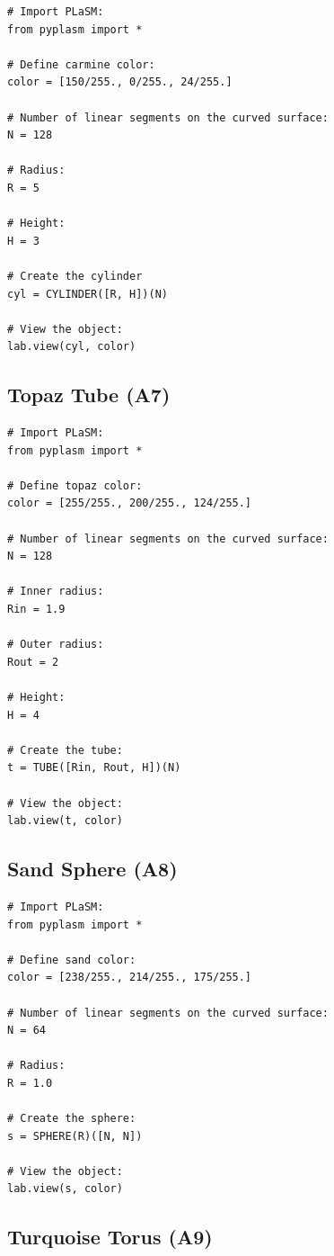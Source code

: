 \documentclass{article}
\begin{document}
\begin{verbatim}
# Import PLaSM:
from pyplasm import *

# Define carmine color:
color = [150/255., 0/255., 24/255.]

# Number of linear segments on the curved surface:
N = 128

# Radius:
R = 5

# Height:
H = 3

# Create the cylinder
cyl = CYLINDER([R, H])(N)

# View the object:
lab.view(cyl, color)
\end{verbatim}


\subsection{Topaz Tube (A7)}

\begin{verbatim}
# Import PLaSM:
from pyplasm import *

# Define topaz color:
color = [255/255., 200/255., 124/255.]

# Number of linear segments on the curved surface:
N = 128

# Inner radius:
Rin = 1.9

# Outer radius:
Rout = 2

# Height:
H = 4

# Create the tube:
t = TUBE([Rin, Rout, H])(N)

# View the object:
lab.view(t, color)
\end{verbatim}


\subsection{Sand Sphere (A8)}

\begin{verbatim}
# Import PLaSM:
from pyplasm import *

# Define sand color:
color = [238/255., 214/255., 175/255.]

# Number of linear segments on the curved surface:
N = 64

# Radius:
R = 1.0

# Create the sphere:
s = SPHERE(R)([N, N])

# View the object:
lab.view(s, color)
\end{verbatim}


\subsection{Turquoise Torus (A9)}
\end{document}
